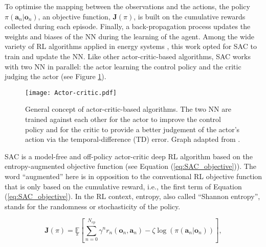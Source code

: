\documentclass[11pt,twoside,a4paper,english]{article}
\def\ie{i.e., }
\begin{document}
To optimise the mapping between the observations and the actions, the policy $\pi\left(\bm{a}_n | \bm{o}_n\right)$, an objective function, $\bm{J}(\pi)$, is built on the cumulative rewards collected during each episode. Finally, a back-propagation process updates the weights and biases of the \gls{NN} during the learning of the agent. Among the wide variety of \gls{RL} algorithms applied in energy systems \cite{perera2021applications}, this work opted for \gls{SAC} \cite{haarnoja2018soft} to train and update the \gls{NN}.  Like other actor-critic-based algorithms, \gls{SAC} works with two \gls{NN} in parallel: the actor learning the control policy and the critic judging the actor (see Figure \ref{fig:Actor-critic}).

\begin{figure}[!htbp]
\centering
\texttt{[image: Actor-critic.pdf]}
\caption{General concept of actor-critic-based algorithms. The two \gls{NN} are trained against each other for the actor to improve the control policy and for the critic to provide a better judgement of the actor's action via the temporal-difference (TD) error. Graph adapted from \cite{cao2020reinforcement}.}
\label{fig:Actor-critic}
\end{figure}

\newpage
\gls{SAC} is a model-free and off-policy actor-critic deep \gls{RL} algorithm based on the entropy-augmented objective function (see Equation (\ref{eq:SAC_objective})). The word ``augmented'' here is in opposition to the conventional \gls{RL} objective function that is only based on the cumulative reward, \ie the first term of Equation (\ref{eq:SAC_objective}). In the \gls{RL} context, entropy, also called ``Shannon entropy'', stands for the randomness or stochasticity of the policy.

\begin{equation}
    \label{eq:SAC_objective}
    \bm{J}(\pi) = \underset{\pi}{\mathbb{E}}\left[\underset{n=0}{\overset{N_{ep}}{\sum}}\gamma^n r_n\left(\bm{o}_n,\bm{a}_n \right) - \zeta \log \left(\pi\left(\bm{a}_n | \bm{o}_n\right) \right) \right],
\end{equation}
\end{document}
